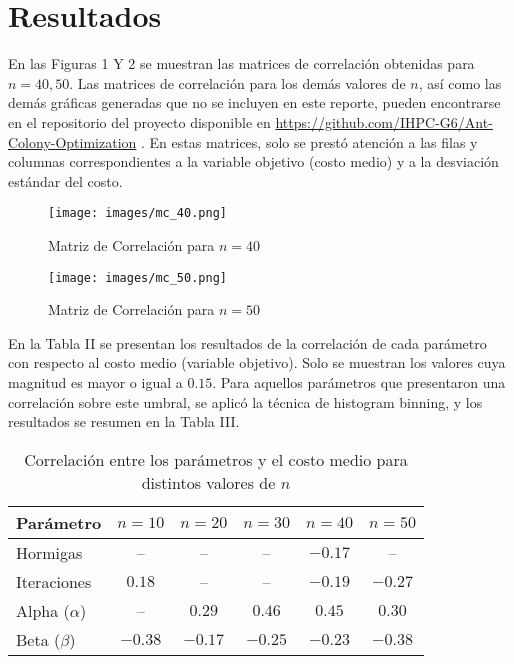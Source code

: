 \documentclass[conference]{IEEEtran}
\begin{document}
\section{Resultados}
En las Figuras 1 Y 2 se muestran las matrices de correlación obtenidas para $n=40,50$. Las matrices de correlación para los demás valores de $n$, así como las demás gráficas generadas que no se incluyen en este reporte, pueden encontrarse en el repositorio del proyecto disponible en \url{https://github.com/IHPC-G6/Ant-Colony-Optimization} . En estas matrices, solo se prestó atención a las filas y columnas correspondientes a la variable objetivo (costo medio) y a la desviación estándar del costo.

    \begin{figure}[htbp]
      \centering
      \begin{minipage}[t]{0.45\linewidth}
        \centering
        \texttt{[image: images/mc\_40.png]}
        \caption{Matriz de Correlación para $n=40$}
        \label{fig:image29}
      \end{minipage}
      \hfill
      \begin{minipage}[t]{0.45\linewidth}
        \centering
        \texttt{[image: images/mc\_50.png]}
        \caption{Matriz de Correlación para $n=50$}
        \label{fig:image30}
      \end{minipage}
    \end{figure}

En la Tabla II se presentan los resultados de la correlación de cada parámetro con respecto al costo medio (variable objetivo). Solo se muestran los valores cuya magnitud es mayor o igual a $0.15$. Para aquellos parámetros que presentaron una correlación sobre este umbral, se aplicó la técnica de histogram binning, y los resultados se resumen en la Tabla III.

\begin{table}[h]
\centering
\begin{tabular}{|l|c|c|c|c|c|}
\hline
Parámetro & $n=10$ & $n=20$ & $n=30$ & $n=40$ & $n=50$ \\
\hline
Hormigas & -- & -- & -- & $-0.17$ & -- \\
\hline
Iteraciones & $0.18$ & -- & -- & $-0.19$ & $-0.27$ \\
\hline
Alpha ($\alpha$) & -- & $0.29$ & $0.46$ & $0.45$ & $0.30$ \\
\hline
Beta ($\beta$) & $-0.38$ & $-0.17$ & $-0.25$ & $-0.23$ & $-0.38$ \\
\hline
\end{tabular}
\caption{Correlación entre los parámetros y el costo medio para distintos valores de $n$}
\label{tab:table2}
\end{table}
\end{document}
